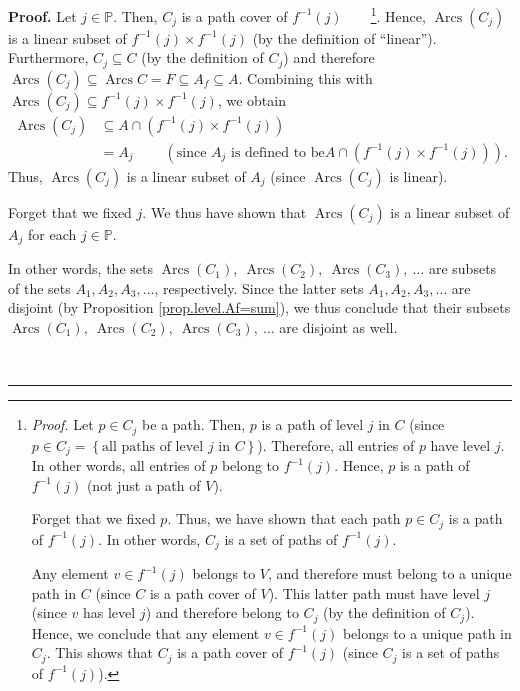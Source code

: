 \documentclass[numbers=enddot,12pt,final,onecolumn,notitlepage]{scrartcl}%
\numberwithin{exer}{section}
\theoremstyle{definition}
\newenvironment{proof}[1][Proof]{\noindent\textbf{#1.} }{\ \rule{0.5em}{0.5em}}
\newenvironment{verlong}{}{}
\begin{document}
\begin{verlong}
\begin{proof}
Let $j\in\mathbb{P}$. Then, $C_{j}$ is a path cover of $f^{-1}\left(
j\right)  $\ \ \ \ \footnote{\textit{Proof.} Let $p\in C_{j}$ be a path. Then,
$p$ is a path of level $j$ in $C$ (since $p\in C_{j}=\left\{  \text{all paths
of level }j\text{ in }C\right\}  $). Therefore, all entries of $p$ have level
$j$. In other words, all entries of $p$ belong to $f^{-1}\left(  j\right)  $.
Hence, $p$ is a path of $f^{-1}\left(  j\right)  $ (not just a path of $V$).
\par
Forget that we fixed $p$. Thus, we have shown that each path $p\in C_{j}$ is a
path of $f^{-1}\left(  j\right)  $. In other words, $C_{j}$ is a set of paths
of $f^{-1}\left(  j\right)  $.
\par
Any element $v\in f^{-1}\left(  j\right)  $ belongs to $V$, and therefore must
belong to a unique path in $C$ (since $C$ is a path cover of $V$). This latter
path must have level $j$ (since $v$ has level $j$) and therefore belong to
$C_{j}$ (by the definition of $C_{j}$). Hence, we conclude that any element
$v\in f^{-1}\left(  j\right)  $ belongs to a unique path in $C_{j}$. This
shows that $C_{j}$ is a path cover of $f^{-1}\left(  j\right)  $ (since
$C_{j}$ is a set of paths of $f^{-1}\left(  j\right)  $).}. Hence,
$\operatorname*{Arcs}\left(  C_{j}\right)  $ is a linear subset of
$f^{-1}\left(  j\right)  \times f^{-1}\left(  j\right)  $ (by the definition
of \textquotedblleft linear\textquotedblright). Furthermore, $C_{j}\subseteq
C$ (by the definition of $C_{j}$) and therefore $\operatorname*{Arcs}\left(
C_{j}\right)  \subseteq\operatorname*{Arcs}C=F\subseteq A_{f}\subseteq A$.
Combining this with $\operatorname*{Arcs}\left(  C_{j}\right)  \subseteq
f^{-1}\left(  j\right)  \times f^{-1}\left(  j\right)  $, we obtain
\begin{align*}
\operatorname*{Arcs}\left(  C_{j}\right)   &  \subseteq A\cap\left(
f^{-1}\left(  j\right)  \times f^{-1}\left(  j\right)  \right) \\
&  =A_{j}\ \ \ \ \ \ \ \ \ \ \left(  \text{since }A_{j}\text{ is defined to be
}A\cap\left(  f^{-1}\left(  j\right)  \times f^{-1}\left(  j\right)  \right)
\right)  .
\end{align*}
Thus, $\operatorname*{Arcs}\left(  C_{j}\right)  $ is a linear subset of
$A_{j}$ (since $\operatorname*{Arcs}\left(  C_{j}\right)  $ is linear).

Forget that we fixed $j$. We thus have shown that $\operatorname*{Arcs}\left(
C_{j}\right)  $ is a linear subset of $A_{j}$ for each $j\in\mathbb{P}$.

In other words, the sets $\operatorname*{Arcs}\left(  C_{1}\right)
,\ \operatorname*{Arcs}\left(  C_{2}\right)  ,\ \operatorname*{Arcs}\left(
C_{3}\right)  ,\ \ldots$ are subsets of the sets $A_{1},A_{2},A_{3},\ldots$,
respectively. Since the latter sets $A_{1},A_{2},A_{3},\ldots$ are disjoint
(by Proposition \ref{prop.level.Af=sum}), we thus conclude that their subsets
$\operatorname*{Arcs}\left(  C_{1}\right)  ,\ \operatorname*{Arcs}\left(
C_{2}\right)  ,\ \operatorname*{Arcs}\left(  C_{3}\right)  ,\ \ldots$ are
disjoint as well.


\end{proof}
\end{verlong}
\end{document}
